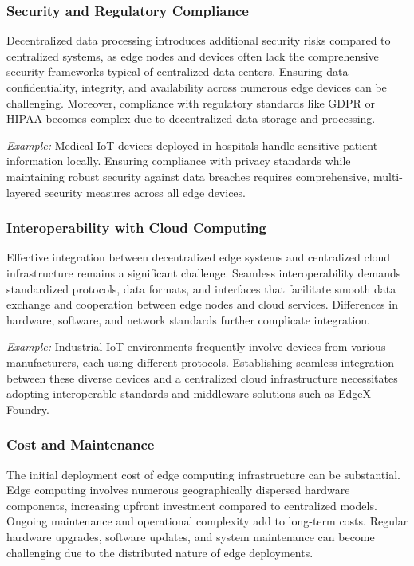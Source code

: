 \documentclass[runningheads]{llncs}
\begin{document}
\subsubsection{Security and Regulatory Compliance}
Decentralized data processing introduces additional security risks compared to centralized systems, as edge nodes and devices often lack the comprehensive security frameworks typical of centralized data centers. Ensuring data confidentiality, integrity, and availability across numerous edge devices can be challenging. Moreover, compliance with regulatory standards like GDPR or HIPAA becomes complex due to decentralized data storage and processing.

\noindent\textit{Example:} Medical IoT devices deployed in hospitals handle sensitive patient information locally. Ensuring compliance with privacy standards while maintaining robust security against data breaches requires comprehensive, multi-layered security measures across all edge devices.

\subsubsection{Interoperability with Cloud Computing}
Effective integration between decentralized edge systems and centralized cloud infrastructure remains a significant challenge. Seamless interoperability demands standardized protocols, data formats, and interfaces that facilitate smooth data exchange and cooperation between edge nodes and cloud services. Differences in hardware, software, and network standards further complicate integration.

\noindent\textit{Example:} Industrial IoT environments frequently involve devices from various manufacturers, each using different protocols. Establishing seamless integration between these diverse devices and a centralized cloud infrastructure necessitates adopting interoperable standards and middleware solutions such as EdgeX Foundry.

\subsubsection{Cost and Maintenance}
The initial deployment cost of edge computing infrastructure can be substantial. Edge computing involves numerous geographically dispersed hardware components, increasing upfront investment compared to centralized models. Ongoing maintenance and operational complexity add to long-term costs. Regular hardware upgrades, software updates, and system maintenance can become challenging due to the distributed nature of edge deployments.
\end{document}
